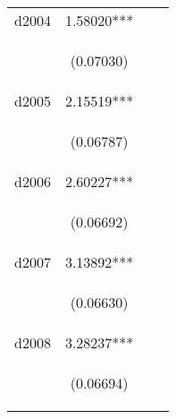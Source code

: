 \begin{center}
\begin{tabular}{lccc}
d2004 & 1.58020*** &  &  \\
\vspace{4pt} & \begin{footnotesize}(0.07030)\end{footnotesize} & \begin{footnotesize}\end{footnotesize} & \begin{footnotesize}\end{footnotesize} \\
d2005 & 2.15519*** &  &  \\
\vspace{4pt} & \begin{footnotesize}(0.06787)\end{footnotesize} & \begin{footnotesize}\end{footnotesize} & \begin{footnotesize}\end{footnotesize} \\
d2006 & 2.60227*** &  &  \\
\vspace{4pt} & \begin{footnotesize}(0.06692)\end{footnotesize} & \begin{footnotesize}\end{footnotesize} & \begin{footnotesize}\end{footnotesize} \\
d2007 & 3.13892*** &  &  \\
\vspace{4pt} & \begin{footnotesize}(0.06630)\end{footnotesize} & \begin{footnotesize}\end{footnotesize} & \begin{footnotesize}\end{footnotesize} \\
d2008 & 3.28237*** &  &  \\
\vspace{4pt} & \begin{footnotesize}(0.06694)\end{footnotesize} & \begin{footnotesize}\end{footnotesize} & \begin{footnotesize}\end{footnotesize} \\

\end{tabular}
\end{center}
